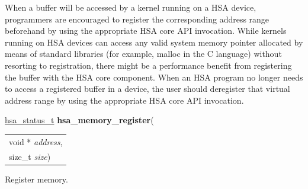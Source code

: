\documentclass[final]{book}
\newcommand{\hsaarg}[1]{\textit{#1}}
\begin{document}
When a buffer will be accessed by a kernel running on a HSA device, programmers
are encouraged to register the corresponding address range beforehand by using
the appropriate HSA core API invocation. While kernels running on HSA devices
can access any valid system memory pointer allocated by means of standard
libraries (for example, malloc in the C language) without resorting to
registration, there might be a performance benefit from registering the buffer
with the HSA core component. When an HSA program no longer needs to access a
registered buffer in a device, the user should deregister that virtual address
range by using the appropriate HSA core API invocation.

\makeatletter{}

\noindent\begin{tcolorbox}[breakable,nobeforeafter,colframe=white,colback=lightgray,left=0mm]
\hyperlink{group--status-1gad755322e7ff95456520e8abdbe90d225}{hsa_status_t} \hypertarget{group--register-1ga13131274af7b6c583b689eaaca3e21f0}{\textbf{hsa_memory_register}}(
\vspace{-3.5mm}\begin{longtable}{@{}p{\textwidth}}
\hspace{1.7em}void * \hsaarg{address},\\
\hspace{1.7em}size_t \hsaarg{size})\end{longtable}

\end{tcolorbox}
Register memory.
\end{document}
